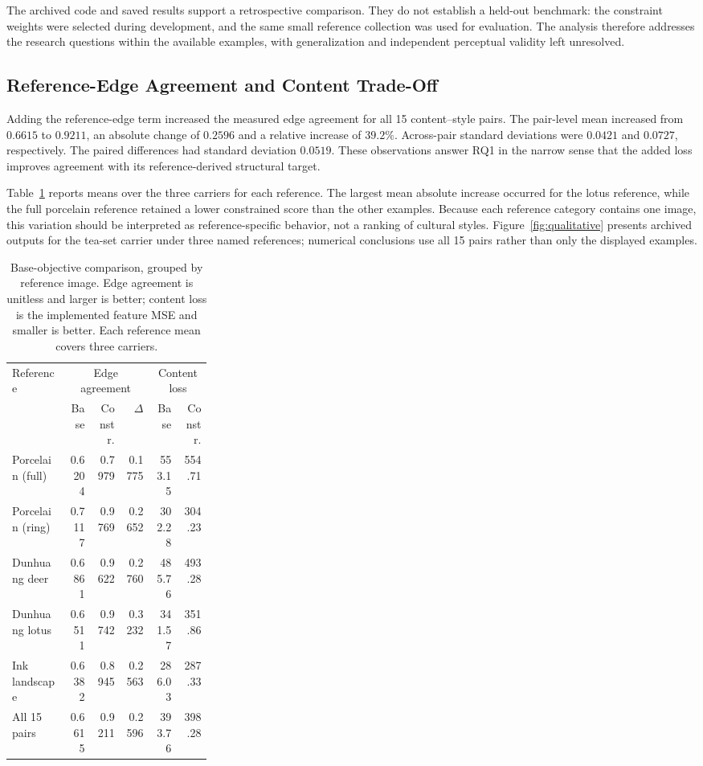 \documentclass[manuscript,acmlarge,screen,review]{acmart}
\begin{document}
The archived code and saved results support a retrospective comparison. They do not establish a held-out benchmark: the constraint weights were selected during development, and the same small reference collection was used for evaluation. The analysis therefore addresses the research questions within the available examples, with generalization and independent perceptual validity left unresolved.

\subsection{Reference-Edge Agreement and Content Trade-Off}
Adding the reference-edge term increased the measured edge agreement for all 15 content--style pairs. The pair-level mean increased from $0.6615$ to $0.9211$, an absolute change of $0.2596$ and a relative increase of $39.2\%$. Across-pair standard deviations were $0.0421$ and $0.0727$, respectively. The paired differences had standard deviation $0.0519$. These observations answer RQ1 in the narrow sense that the added loss improves agreement with its reference-derived structural target.

Table~\ref{tab:main} reports means over the three carriers for each reference. The largest mean absolute increase occurred for the lotus reference, while the full porcelain reference retained a lower constrained score than the other examples. Because each reference category contains one image, this variation should be interpreted as reference-specific behavior, not a ranking of cultural styles. Figure~\ref{fig:qualitative} presents archived outputs for the tea-set carrier under three named references; numerical conclusions use all 15 pairs rather than only the displayed examples.

\begin{table}[t]
\centering
\caption{Base-objective comparison, grouped by reference image. Edge agreement is unitless and larger is better; content loss is the implemented feature MSE and smaller is better. Each reference mean covers three carriers.}
\label{tab:main}
\small
\begin{tabular}{@{}p{0.29\linewidth}rrrrr@{}}
\toprule
Reference & \multicolumn{3}{c}{Edge agreement} & \multicolumn{2}{c}{Content loss}\\
\cmidrule(lr){2-4}\cmidrule(l){5-6}
 & Base & Constr. & $\Delta$ & Base & Constr.\\
\midrule
Porcelain (full) & 0.6204 & 0.7979 & 0.1775 & 553.15 & 554.71\\
Porcelain (ring) & 0.7117 & 0.9769 & 0.2652 & 302.28 & 304.23\\
Dunhuang deer & 0.6861 & 0.9622 & 0.2760 & 485.76 & 493.28\\
Dunhuang lotus & 0.6511 & 0.9742 & 0.3232 & 341.57 & 351.86\\
Ink landscape & 0.6382 & 0.8945 & 0.2563 & 286.03 & 287.33\\
\midrule
All 15 pairs & 0.6615 & 0.9211 & 0.2596 & 393.76 & 398.28\\
\bottomrule
\end{tabular}
\end{table}
\end{document}
